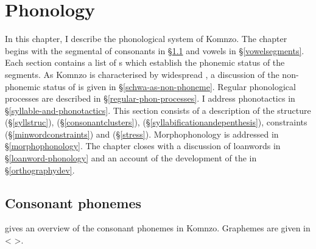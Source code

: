 
\chapter{Phonology} \label{cha:Phonology}

In this chapter, I describe the phonological system of Komnzo. The chapter begins with the segmental  of consonants in {\S}\ref{consonant-segments} and vowels in {\S}\ref{vowelsegments}. Each section contains a list of s which establish the phonemic status of the segments. As Komnzo  is characterised by widespread , a discussion of the non-phonemic status of  is given in {\S}\ref{schwa-as-non-phoneme}. Regular phonological processes are described in {\S}\ref{regular-phon-processes}. I address phonotactics in {\S}\ref{syllable-and-phonotactics}. This section consists of a description of the  structure ({\S}\ref{syllstruc}),  ({\S}\ref{consonantclusters}),  ({\S}\ref{syllabificationandepenthesis}),  constraints ({\S}\ref{minwordconstraints}) and  ({\S}\ref{stress}). Morphophonology is addressed in {\S}\ref{morphophonology}. The chapter closes with a discussion of loanwords in {\S}\ref{loanword-phonology} and an account of the development of the  in {\S}\ref{orthographydev}.
\vspace{-0,3cm}

\section{Consonant phonemes} \label{consonant-segments}

 gives an overview of the consonant phonemes in Komnzo. Graphemes are given in < >.

